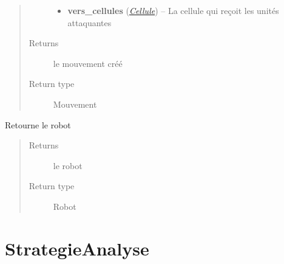 \documentclass[letterpaper,10pt,english]{sphinxmanual}
\begin{document}
\begin{fulllineitems}
\begin{fulllineitems}
\begin{quote}
\begin{description}
\begin{itemize}
\item {} 
\textbf{vers\_cellules} ({\hyperref[index:module-Cellule]{\emph{Cellule}}}) -- La cellule qui reçoit les unités attaquantes

\end{itemize}

\item[{Returns}] \leavevmode
le mouvement créé

\item[{Return type}] \leavevmode
Mouvement

\end{description}\end{quote}

\end{fulllineitems}


\begin{fulllineitems}
\label{index:Strategie.Strategie.getRobot}
Retourne le robot
\begin{quote}\begin{description}
\item[{Returns}] \leavevmode
le robot

\item[{Return type}] \leavevmode
Robot

\end{description}\end{quote}

\end{fulllineitems}


\end{fulllineitems}



\chapter{StrategieAnalyse}
\label{index:module-StrategieAnalyse}\label{index:strategieanalyse}
\end{document}
